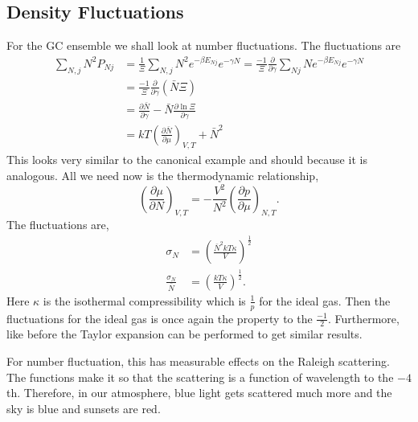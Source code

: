 \subsection{Density Fluctuations}
For the GC ensemble we shall look at number fluctuations. The fluctuations are
\begin{align*}
	\sum_{N,j}{N^2 P_{Nj}} &= \frac{1}{\Xi}\sum_{N,j}{N^2 e^{-\beta E_{Nj}}
	e^{-\gamma N}} = \frac{-1}{\Xi} \frac{\partial}{\partial\gamma}
	\sum_{Nj}{N e^{-\beta E_{Nj}}e^{-\gamma N}}\\
						   &= \frac{-1}{\Xi} \frac{\partial}{\partial\gamma}
						   (\bar{N}\Xi)\\
						   &= \frac{\partial\bar{N}}{\partial\gamma} -
						   \bar{N} \frac{\partial\ln{\Xi}}{\partial\gamma}\\
						   &= kT \left( \frac{\partial\bar{N}}{\partial\mu}
						   \right)_{V, T} + \bar{N}^2
\end{align*}
This looks very similar to the canonical example and should because it is
analogous. All we need now is the thermodynamic relationship,
\begin{equation*}
	\left( \frac{\partial\mu}{\partial N} \right)_{V,T} =
	- \frac{V^2}{N^2} \left( \frac{\partial p}{\partial\mu}\right)_{N,T}.
\end{equation*}
The fluctuations are,
\begin{align*}
	\sigma_N &= \left( \frac{\bar{N}^2 kT\kappa}{V}\right)^{\frac{1}{2}}\\
	\frac{\sigma_N}{\bar{N}} &= \left( \frac{kT\kappa}{V} \right)^{\frac{1}{2}}.
\end{align*}
Here $\kappa$ is the isothermal compressibility which is $\frac{1}{p}$ for the
ideal gas. Then the fluctuations for the ideal gas is once again the property to
the $\frac{-1}{2}$. Furthermore, like before the Taylor expansion can be
performed to get similar results.

For number fluctuation, this has measurable effects on the Raleigh scattering.
The functions make it so that the scattering is a function of wavelength to the
$-4$th. Therefore, in our atmosphere, blue light gets scattered much more and
the sky is blue and sunsets are red.
